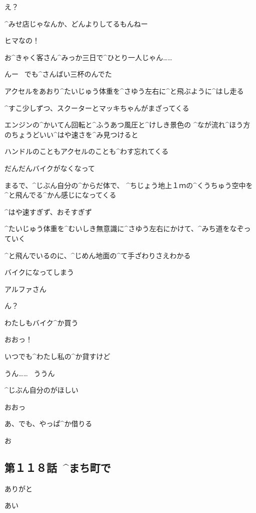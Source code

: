 \Makki え？

\Alpha ^{みせ}{店}じゃなんか、どんよりしてるもんねー

\Makki ヒマなの！

\Makki お^{きゃく}{客}さん^{みっか}{三日}で^{ひとり}{一人}じゃん……

\Alpha んー
\ でも^{さんばい}{三杯}のんでた

\page
\Alpha アクセルをあおり^{たいじゅう}{体重}を^{さゆう}{左右}に^{と}{飛}ぶように^{はし}{走}る

\Alpha ^{すこ}{少}しずつ、スクーターとマッキちゃんがまざってくる

\page
\Makki エンジンの^{かいてん}{回転}と^{ふうあつ}{風圧}と^{けしき}{景色}の
^{なが}{流}れ^{ほう}{方}のちょうどいい^{はや}{速}さを^{み}{見}つけると

\Makki ハンドルのこともアクセルのことも^{わす}{忘}れてくる

\Makki だんだんバイクがなくなって

\Makki まるで、^{じぶん}{自分}の^{からだ}{体}で、
^{ちじょう}{地上}１ｍの^{くうちゅう}{空中}を^{と}{飛}んでる^{かん}{感}じになってくる

\page
\Makki ^{はや}{速}すぎず、おそすぎず

\Makki ^{たいじゅう}{体重}を^{むいしき}{無意識}に^{さゆう}{左右}にかけて、^{みち}{道}をなぞっていく

\Makki ^{と}{飛}んでいるのに、^{じめん}{地面}の^{て}{手}ざわりさえわかる

\Makki バイクになってしまう

\page
\Makki アルファさん

\Alpha ん？

\Makki わたしもバイク^{か}{買}う

\Alpha おおっ！

\Alpha いつでも^{わたし}{私}の^{か}{貸}すけど

\Makki うん……
\ ううん

\Makki ^{じぶん}{自分}のがほしい

\Alpha おおっ

\page
\Makki あ、でも、やっぱ^{か}{借}りる

\Alpha お


\subsection{第１１８話\ ^{まち}{町}で}

\page[102]
\Alpha ありがと

\Person あい

